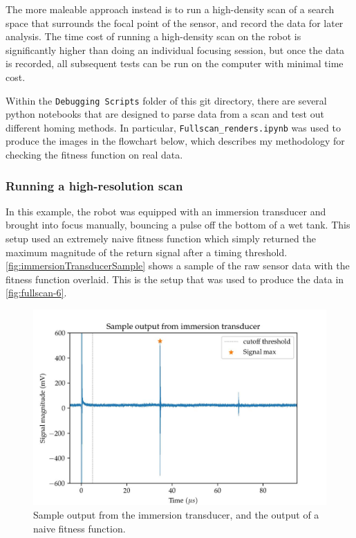 \documentclass[11pt]{article}
\begin{document}
The more maleable approach instead is to run a high-density scan of a search space that surrounds the focal point of the sensor, and record the data for later analysis. The time cost of running a high-density scan on the robot is significantly higher than doing an individual focusing session, but once the data is recorded, all subsequent tests can be run on the computer with minimal time cost.

Within the \texttt{Debugging Scripts} folder of this git directory, there are several python notebooks that are designed to parse data from a scan and test out different homing methods. In particular, \texttt{Fullscan\_renders.ipynb} was used to produce the images in the flowchart below, which describes my methodology for checking the fitness function on real data.

\subsubsection{Running a high-resolution scan}
In this example, the robot was equipped with an immersion transducer and brought into focus manually, bouncing a pulse off the bottom of a wet tank. This setup used an extremely naive fitness function which simply returned the maximum magnitude of the return signal after a timing threshold. \autoref{fig:immersionTransducerSample} shows a sample of the raw sensor data with the fitness function overlaid.
This is the setup that was used to produce the data in \autoref{fig:fullscan-6}.

\begin{figure}[ht]
\begin{center}
    \includegraphics[width=.75\linewidth]{figures/IT_sample_1.jpg}
    \caption{Sample output from the immersion transducer, and the output of a naive fitness function.}\label{fig:immersionTransducerSample}
\end{center}
\end{figure}
\end{document}
